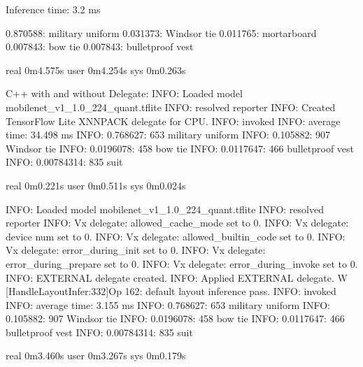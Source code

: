 Inference time: 3.2 ms

0.870588: military uniform
0.031373: Windsor tie
0.011765: mortarboard
0.007843: bow tie
0.007843: bulletproof vest

real    0m4.575s
user    0m4.254s
sys     0m0.263s
\endtt

C++ with and without Delegate:
\begtt
INFO: Loaded model mobilenet_v1_1.0_224_quant.tflite
INFO: resolved reporter
INFO: Created TensorFlow Lite XNNPACK delegate for CPU.
INFO: invoked
INFO: average time: 34.498 ms
INFO: 0.768627: 653 military uniform
INFO: 0.105882: 907 Windsor tie
INFO: 0.0196078: 458 bow tie
INFO: 0.0117647: 466 bulletproof vest
INFO: 0.00784314: 835 suit

real    0m0.221s
user    0m0.511s
sys     0m0.024s


INFO: Loaded model mobilenet_v1_1.0_224_quant.tflite
INFO: resolved reporter
INFO: Vx delegate: allowed_cache_mode set to 0.
INFO: Vx delegate: device num set to 0.
INFO: Vx delegate: allowed_builtin_code set to 0.
INFO: Vx delegate: error_during_init set to 0.
INFO: Vx delegate: error_during_prepare set to 0.
INFO: Vx delegate: error_during_invoke set to 0.
INFO: EXTERNAL delegate created.
INFO: Applied EXTERNAL delegate.
W [HandleLayoutInfer:332]Op 162: default layout inference pass.
INFO: invoked
INFO: average time: 3.155 ms
INFO: 0.768627: 653 military uniform
INFO: 0.105882: 907 Windsor tie
INFO: 0.0196078: 458 bow tie
INFO: 0.0117647: 466 bulletproof vest
INFO: 0.00784314: 835 suit

real    0m3.460s
user    0m3.267s
sys     0m0.179s
\endtt

\bye
